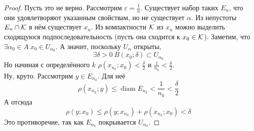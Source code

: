 \documentclass{article}
\let\eps\varepsilon
\begin{document}
    \begin{proof}
        Пусть это не верно. Рассмотрим $\eps=\frac1n$. Существует набор таких $E_n$, что они удовлетворяют указанным свойствам, но не существует $\alpha$. Из непустоты $E_n\cap{\mathcal{K}}$ в нём существует $x_n$. Из компактности ${\mathcal{K}}$ из $x_n$ можно выделить сходящуюся подпоследовательность (пусть она сходится к $x_0\in{\mathcal{K}}$). Заметим, что $\exists\alpha_0\in A~x_0\in U_{\alpha_0}$. А значит, поскольку $U_\alpha$ открыты,
        $$
        \exists\delta>0~B(x_0;\delta)\subset U_{\alpha_0}
        $$
        Но начиная с определённого $k$ $\rho(x_{n_k};x_0)<\frac\delta2$ и $\frac1{n_k}<\frac\delta2$.\\
        Ну, круто. Рассмотрим $y\in E_{n_k}$. Для неё
        $$
        \rho(x_{n_k};y)\leqslant\operatorname{diam}E_{n_k}<\frac1{n_k}<\frac\delta2
        $$
        А отсюда
        $$
        \rho(y;x_0)\leqslant\rho(y;x_{n_k})+\rho(x_{n_k};x_0)<\delta
        $$
        Это противоречие, так как $E_{n_k}$ покрывается $U_{\alpha_0}$.
    \end{proof}
\end{document}
